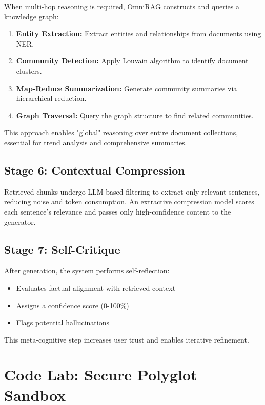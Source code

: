 \documentclass[conference]{IEEEtran}
\begin{document}
When multi-hop reasoning is required, OmniRAG constructs and queries a knowledge graph:

\begin{enumerate}
    \item \textbf{Entity Extraction:} Extract entities and relationships from documents using NER.
    \item \textbf{Community Detection:} Apply Louvain algorithm to identify document clusters.
    \item \textbf{Map-Reduce Summarization:} Generate community summaries via hierarchical reduction.
    \item \textbf{Graph Traversal:} Query the graph structure to find related communities.
\end{enumerate}

This approach enables "global" reasoning over entire document collections, essential for trend analysis and comprehensive summaries.

\subsection{Stage 6: Contextual Compression}

Retrieved chunks undergo LLM-based filtering to extract only relevant sentences, reducing noise and token consumption. An extractive compression model scores each sentence's relevance and passes only high-confidence content to the generator.

\subsection{Stage 7: Self-Critique}

After generation, the system performs self-reflection:
\begin{itemize}
    \item Evaluates factual alignment with retrieved context
    \item Assigns a confidence score (0-100\%)
    \item Flags potential hallucinations
\end{itemize}

This meta-cognitive step increases user trust and enables iterative refinement.


\section{Code Lab: Secure Polyglot Sandbox}
\end{document}
